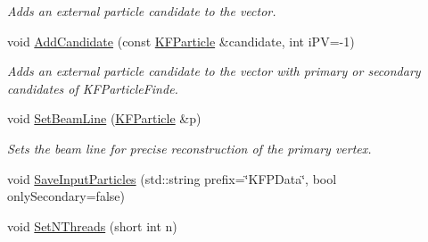 \begin{DoxyCompactItemize}
\begin{DoxyCompactList}\small\item\em Adds an external particle candidate to the vector. \end{DoxyCompactList}\item 
void \hyperlink{classKFParticleTopoReconstructor_abe8d3eea41f265993c10b2d55748b7a4}{Add\+Candidate} (const \hyperlink{classKFParticle}{K\+F\+Particle} \&candidate, int i\+PV=-\/1)\hypertarget{classKFParticleTopoReconstructor_abe8d3eea41f265993c10b2d55748b7a4}{}\label{classKFParticleTopoReconstructor_abe8d3eea41f265993c10b2d55748b7a4}

\begin{DoxyCompactList}\small\item\em Adds an external particle candidate to the vector with primary or secondary candidates of K\+F\+Particle\+Finde. \end{DoxyCompactList}\item 
void \hyperlink{classKFParticleTopoReconstructor_aa7d16732148104bc4e6fd8cb7a29908c}{Set\+Beam\+Line} (\hyperlink{classKFParticle}{K\+F\+Particle} \&p)\hypertarget{classKFParticleTopoReconstructor_aa7d16732148104bc4e6fd8cb7a29908c}{}\label{classKFParticleTopoReconstructor_aa7d16732148104bc4e6fd8cb7a29908c}

\begin{DoxyCompactList}\small\item\em Sets the beam line for precise reconstruction of the primary vertex. \end{DoxyCompactList}\item 
void \hyperlink{classKFParticleTopoReconstructor_ae5019fcf167648df8c0c857bcb787253}{Save\+Input\+Particles} (std\+::string prefix=\char`\"{}K\+F\+P\+Data\char`\"{}, bool only\+Secondary=false)
\item 
void \hyperlink{classKFParticleTopoReconstructor_a69da1d3a346d4772045d6cffe3ccc98e}{Set\+N\+Threads} (short int n)\hypertarget{classKFParticleTopoReconstructor_a69da1d3a346d4772045d6cffe3ccc98e}{}\label{classKFParticleTopoReconstructor_a69da1d3a346d4772045d6cffe3ccc98e}


\end{DoxyCompactItemize}
